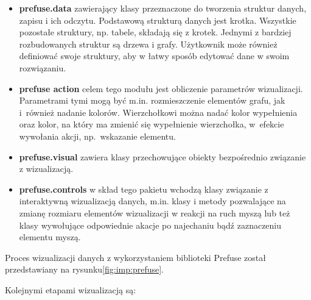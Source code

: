 \begin{itemize}
 \item {\bf prefuse.data} zawierający klasy przeznaczone do tworzenia struktur danych, zapisu i ich odczytu. Podstawową strukturą danych jest krotka. 
Wszystkie pozostałe struktury, np. tabele, składają się z krotek. Jednymi z bardziej rozbudowanych struktur są drzewa i grafy. Użytkownik może również 
definiować swoje struktury, aby w łatwy sposób edytować dane w swoim rozwiązaniu. 
\item{ \bf prefuse action} celem tego modułu jest obliczenie parametrów wizualizacji. Parametrami tymi mogą być m.in. rozmieszczenie elementów grafu, jak i~również 
nadanie kolorów. Wierzchołkowi można nadać kolor wypełnienia oraz kolor, na który ma zmienić się wypełnienie wierzchołka, w~efekcie wywołania akcji, np.~wskazanie elementu. 
\item{ \bf prefuse.visual } zawiera klasy przechowujące obiekty bezpośrednio związanie z wizualizacją. 

\item{ \bf prefuse.controls} w skład tego pakietu wchodzą klasy związanie z interaktywną wizualizacją danych,  m.in. klasy  i metody pozwalające na zmianę rozmiaru
elementów wizualizacji w reakcji na ruch myszą lub też klasy wywołujące odpowiednie akacje po najechaniu bądź zaznaczeniu elementu myszą. 


\end{itemize}



Proces wizualizacji danych z wykorzystaniem biblioteki Prefuse został przedstawiany na rysunku\space \ref{fig:imp:prefuse}. 

Kolejnymi etapami wizualizacją są:

